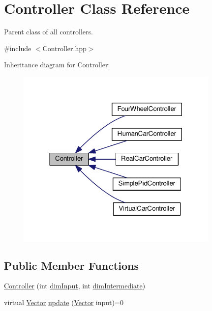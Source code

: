 \hypertarget{classController}{}\section{Controller Class Reference}
\label{classController}


Parent class of all controllers.  




{\ttfamily \#include $<$Controller.\+hpp$>$}



Inheritance diagram for Controller\+:\nopagebreak
\begin{figure}[H]
\begin{center}
\leavevmode
\includegraphics[width=281pt]{classController__inherit__graph}
\end{center}
\end{figure}
\subsection*{Public Member Functions}
\begin{DoxyCompactItemize}
\item 
\hyperlink{classController_aad5cc1765e936fb123c5cb90f120e415}{Controller} (int \hyperlink{classController_a187167b349efb6c61871efd990824219}{dim\+Input}, int \hyperlink{classController_a6d34c8bf130f8b8631117ca3e8b44a5d}{dim\+Intermediate})
\item 
virtual \hyperlink{Agent_8hpp_a5dd127bb3cb18b011cf5fd80a906e830}{Vector} \hyperlink{classController_acef11e408fb0d66d272bf5ab828cfbf6}{update} (\hyperlink{Agent_8hpp_a5dd127bb3cb18b011cf5fd80a906e830}{Vector} input)=0
\end{DoxyCompactItemize}
